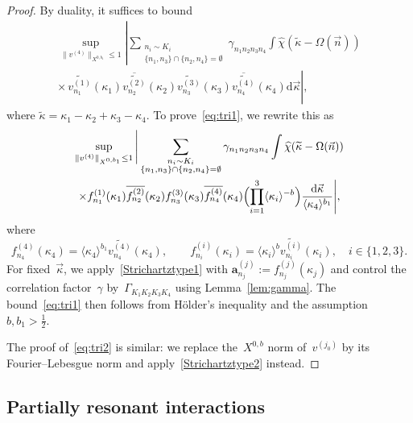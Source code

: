 \documentclass[11pt,reqno,english]{amsart}
\numberwithin{equation}{section}
\theoremstyle{plain}
\theoremstyle{definition}
\theoremstyle{remark}
\newcommand{\ov}{\overline}
\begin{document}
\begin{proof}
	By duality, it suffices to bound
\begin{multline*}
	\sup_{\|v^{(4)}\|_{X^{0,b_{1}}}\le1}
	\left|
	\sum_{\substack{n_{i}\sim K_{i}\\ \{n_{1},n_{3}\}\cap\{n_{2},n_4\}=\emptyset}}
	\gamma_{n_{1}n_{2}n_{3}n_4}
	\int
	\widehat{\chi}(\widetilde{\kappa}-\Omega(\vec n))\right.\\
	\left.\times\,
	\widetilde{v_{n_{1}}^{(1)}}(\kappa_{1})
	\ov{\widetilde{v_{n_{2}}^{(2)}}}(\kappa_{2})
	\widetilde{v_{n_{3}}^{(3)}}(\kappa_{3})
	\ov{\widetilde{v_{n_4}^{(4)}}}(\kappa_{4})
	\mathrm{d}\vec\kappa
	\right|,
\end{multline*}
	where $\widetilde{\kappa}=\kappa_1-\kappa_2+\kappa_3-\kappa_4$.
	To prove~\eqref{eq:tri1}, we rewrite this as
	\begin{multline}
		\label{eq:1}
		\sup_{\|v^{(4)}\|_{X^{0,b_{1}}}\le1}
		\Bigg|
		\sum_{\substack{n_{i}\sim K_{i}\\ \{n_{1},n_{3}\}\cap\{n_{2},n_4\}=\emptyset}}
		\gamma_{n_{1}n_{2}n_{3}n_4}
		\int
		\widehat{\chi}(\widetilde{\kappa}-\Omega(\vec n))
		\\
		\times
		f_{n_{1}}^{(1)}(\kappa_{1})
		\ov{f_{n_{2}}^{(2)}}(\kappa_{2})
		f_{n_{3}}^{(3)}(\kappa_{3})
		\ov{f_{n_4}^{(4)}}(\kappa_{4})
		\Bigl(\prod_{i=1}^{3}\langle\kappa_{i}\rangle^{-b}\Bigr)
		\frac{\mathrm{d}\vec\kappa}{\langle\kappa_{4}\rangle^{b_{1}}}
		\Bigg|,
	\end{multline}
	where
	\[
	f_{n_{4}}^{(4)}(\kappa_{4})=\langle\kappa_{4}\rangle^{b_{1}}\widetilde{v_{n_{4}}^{(4)}}(\kappa_{4}),
	\qquad
	f_{n_{i}}^{(i)}(\kappa_{i})=\langle\kappa_{i}\rangle^{b}\widetilde{v_{n_{i}}^{(i)}}(\kappa_{i}),\quad i\in\{1,2,3\}.
	\]
	For fixed~$\vec\kappa$, we apply~\eqref{Strichartztype1} with
	$\mathbf{a}_{n_{j}}^{(j)}:=f_{n_{j}}^{(j)}(\kappa_{j})$
	and control the correlation factor~$\gamma$ by~$\Gamma_{K_1K_2K_3K_4}$ using Lemma~\ref{lem:gamma}.
	The bound~\eqref{eq:tri1} then follows from H\"older's inequality and the assumption~$b,b_{1}>\tfrac12$.

	The proof of~\eqref{eq:tri2} is similar: we replace the~$X^{0,b}$ norm of~$v^{(j_0)}$ by its Fourier--Lebesgue norm and apply~\eqref{Strichartztype2} instead.
\end{proof}

\subsection{Partially resonant interactions}
\end{document}
